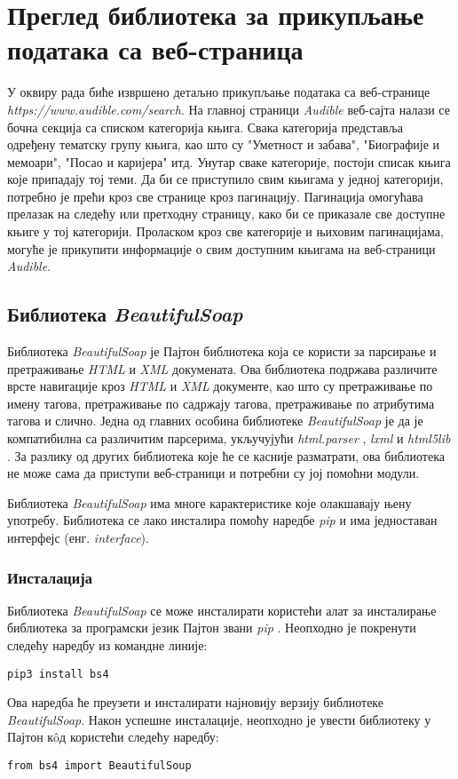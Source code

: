 \documentclass[12pt,oneside]{memoir}
\begin{document}
\chapter{Преглед библиотека за прикупљање података са веб-страница}
\label{chp:alati}
У оквиру рада биће извршено детаљно прикупљање података са веб-странице \textit{https://www.audible.com/search}. На главној страници \textit{Audible} веб-сајта налази се бочна секција са списком категорија књига. Свака категорија представља одређену тематску групу књига, као што су "Уметност и забава", "Биографије и мемоари", "Посао и каријера" итд. Унутар сваке категорије, постоји списак књига које припадају тој теми. Да би се приступило свим књигама у једној категорији, потребно је прећи кроз све странице кроз пагинацију. Пагинација омогућава прелазак на следећу или претходну страницу, како би се приказале све доступне књиге у тој категорији. Проласком кроз све категорије и њиховим пагинацијама, могуће је прикупити информације о свим доступним књигама на  веб-страници \textit{Audible}.

\section{Библиотека \textit{BeautifulSoap}}
\label{chp:beaufiulSoap}
Библиотека \textit{BeautifulSoap} \cite{beautifulSoapDocs} је Пајтон библиотека која се користи за парсирање и претраживање \textit{HTML} и \textit{XML} докумената. Ова библиотека подржава различите врсте навигације кроз \textit{HTML} и \textit{XML} документе, као што су претраживање по имену тагова, претраживање по садржају тагова, претраживање по атрибутима тагова и слично.
Једна од главних особина библиотеке \textit{BeautifulSoap} је да је компатибилна са различитим парсерима, укључујући \textit{html.parser} \cite{htmlParser}, \textit{lxml} \cite{lxmlParser} и \textit{html5lib} \cite{html5lib}. За разлику од других библиотека које ће се касније разматрати, ова библиотека не може сама да приступи веб-страници и потребни су јој помоћни модули. 

Библиотека \textit{BeautifulSoap} има многе карактеристике које олакшавају њену употребу. Библиотека се лако инсталира помоћу наредбе \textit{pip} и има једноставан интерфејс (енг. \textit{interface}).

\subsection{Инсталација}
Библиотека \textit{BeautifulSoap} се може инсталирати користећи алат за инсталирање библиотека за програмски језик Пајтон звани \textit{pip} \cite{pip}. Неопходно је покренути следећу наредбу из командне линије:
\begin{verbatim}
pip3 install bs4
\end{verbatim}
Ова наредба ће преузети и инсталирати најновију верзију библиотеке \textit{BeautifulSoap}. Након успешне инсталације, неопходно је увести библиотеку у Пајтон кôд користећи следећу наредбу:
\begin{verbatim}
from bs4 import BeautifulSoup
\end{verbatim}
\end{document}
